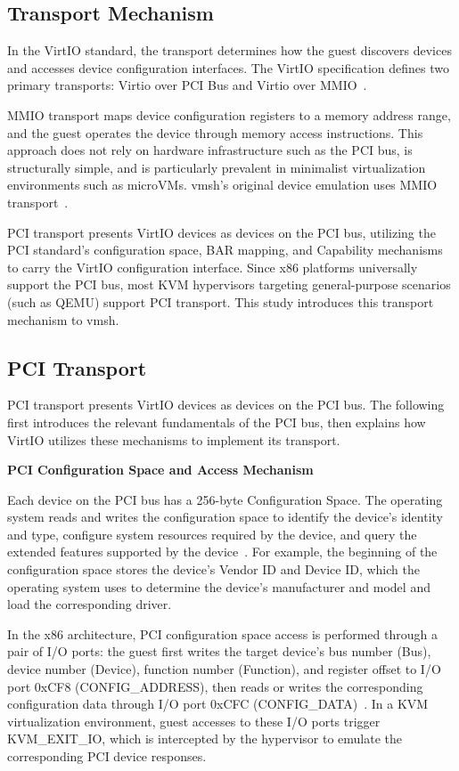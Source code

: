 \begin{ZhChapter}
\subsection{Transport Mechanism}
\label{sec:transport}

In the VirtIO standard, the transport determines how the guest discovers devices and accesses device configuration interfaces. The VirtIO specification defines two primary transports: Virtio over PCI Bus and Virtio over MMIO~\cite{VirtIO11}.

MMIO transport maps device configuration registers to a memory address range, and the guest operates the device through memory access instructions. This approach does not rely on hardware infrastructure such as the PCI bus, is structurally simple, and is particularly prevalent in minimalist virtualization environments such as microVMs. vmsh's original device emulation uses MMIO transport~\cite{Thalheim2022}.

PCI transport presents VirtIO devices as devices on the PCI bus, utilizing the PCI standard's configuration space, BAR mapping, and Capability mechanisms to carry the VirtIO configuration interface. Since x86 platforms universally support the PCI bus, most KVM hypervisors targeting general-purpose scenarios (such as QEMU) support PCI transport. This study introduces this transport mechanism to vmsh.

\subsection{PCI Transport}
\label{sec:pci-transport}

PCI transport presents VirtIO devices as devices on the PCI bus. The following first introduces the relevant fundamentals of the PCI bus, then explains how VirtIO utilizes these mechanisms to implement its transport.

\noindent\textbf{PCI Configuration Space and Access Mechanism}

Each device on the PCI bus has a 256-byte Configuration Space. The operating system reads and writes the configuration space to identify the device's identity and type, configure system resources required by the device, and query the extended features supported by the device~\cite{PCI30}. For example, the beginning of the configuration space stores the device's Vendor ID and Device ID, which the operating system uses to determine the device's manufacturer and model and load the corresponding driver.

In the x86 architecture, PCI configuration space access is performed through a pair of I/O ports: the guest first writes the target device's bus number (Bus), device number (Device), function number (Function), and register offset to I/O port 0xCF8 (CONFIG\_ADDRESS), then reads or writes the corresponding configuration data through I/O port 0xCFC (CONFIG\_DATA)~\cite{PCI30}. In a KVM virtualization environment, guest accesses to these I/O ports trigger KVM\_EXIT\_IO, which is intercepted by the hypervisor to emulate the corresponding PCI device responses.


\end{ZhChapter}
